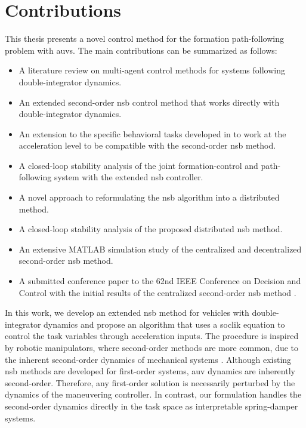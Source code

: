 \section{Contributions}\label{sec:contributions}
This thesis presents a novel control method for the formation path-following problem with \glspl{auv}. The main contributions can be summarized as follows:
\begin{itemize}
    \item A literature review on multi-agent control methods for systems following double-integrator dynamics.
    \item An extended second-order \gls{nsb} control method that works directly with double-integrator dynamics.
    \item An extension to the specific behavioral tasks developed in \cite{matous_singularity-free_2022} to work at the acceleration level to be compatible with the second-order \gls{nsb} method.
    \item A closed-loop stability analysis of the joint formation-control and path-following system with the extended \gls{nsb} controller.
    \item A novel approach to reformulating the \gls{nsb} algorithm into a distributed method.
    \item A closed-loop stability analysis of the proposed distributed \gls{nsb} method.
    \item An extensive MATLAB simulation study of the centralized and decentralized second-order \gls{nsb} method.
    \item A submitted conference paper to the 62nd IEEE Conference on Decision and Control with the initial results of the centralized second-order \gls{nsb} method \citep{lie_formation_2023}.
\end{itemize}


In this work, we develop an extended \gls{nsb} method for vehicles with double-integrator dynamics and propose an algorithm that uses a \gls{soclik} equation to control the task variables through acceleration inputs. The procedure is inspired by robotic manipulators, where second-order methods are more common,  due to the inherent second-order dynamics of mechanical systems \citep{siciliano_differential_2009, chiaverini_kinematically_2008}. Although existing \gls{nsb} methods are developed for first-order systems, \gls{auv} dynamics are inherently second-order. Therefore, any first-order solution is necessarily perturbed by the dynamics of the maneuvering controller. In contrast, our formulation handles the second-order dynamics directly in the task space as interpretable spring-damper systems.

